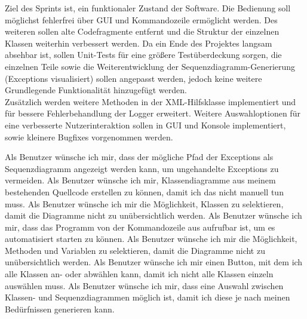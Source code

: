 Ziel des Sprints ist, ein funktionaler Zustand der Software. Die Bedienung soll möglichst fehlerfrei über GUI und Kommandozeile ermöglicht werden. Des weiteren sollen alte Codefragmente entfernt und die Struktur der einzelnen Klassen weiterhin verbessert werden. Da ein Ende des Projektes langsam absehbar ist, sollen Unit-Tests für eine größere Testüberdeckung sorgen, die einzelnen Teile sowie die Weiterentwicklung der Sequenzdiagramm-Generierung (Exceptions visualisiert) sollen angepasst werden, jedoch keine weitere Grundlegende Funktionalität hinzugefügt werden. \\
Zusätzlich werden weitere Methoden in der XML-Hilfsklasse implementiert und für bessere Fehlerbehandlung der Logger erweitert. Weitere Auswahloptionen für eine verbesserte Nutzerinteraktion sollen in GUI und Konsole implementiert, sowie kleinere Bugfixes vorgenommen werden.\\

\nsecend

Als Benutzer wünsche ich mir, dass der mögliche Pfad der Exceptions als Sequenzdiagramm angezeigt werden kann, um ungehandelte Exceptions zu vermeiden.
\nsecend
{}
Als Benutzer wünsche ich mir, Klassendiagramme aus meinem bestehenden Quellcode erstellen zu können, damit ich das nicht manuell tun muss.
\nsecend
{}
Als Benutzer wünsche ich mir die Möglichkeit, Klassen zu selektieren, damit die Diagramme nicht zu unübersichtlich werden.
\nsecend
{}
Als Benutzer wünsche ich mir, dass das Programm von der Kommandozeile aus aufrufbar ist, um es automatisiert starten zu können.
\nsecend
{}
Als Benutzer wünsche ich mir die Möglichkeit, Methoden und Variablen zu selektieren, damit die Diagramme nicht zu unübersichtlich werden.
\nsecend
{}
Als Benutzer wünsche ich mir einen Button, mit dem ich alle Klassen an- oder abwählen kann, damit ich nicht alle Klassen einzeln auswählen muss.
\nsecend
{}
Als Benutzer wünsche ich mir, dass eine Auswahl zwischen Klassen- und Sequenzdiagrammen möglich ist, damit ich diese je nach meinen Bedürfnissen generieren kann.
\nsecend

